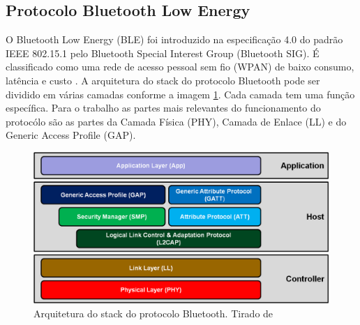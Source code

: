 \subsection{Protocolo Bluetooth Low Energy}
\label{subsec:protocolo_ble}

O Bluetooth Low Energy (BLE) foi introduzido na especificação 4.0 do padrão IEEE 802.15.1 pelo Bluetooth Special Interest Group (Bluetooth SIG). É classificado como uma rede de acesso pessoal sem fio (WPAN) de baixo consumo, latência e custo \cite{Bluetooth_SIG_Site}.
A arquitetura do stack do protocolo Bluetooth pode ser dividido em várias camadas conforme a imagem \ref{fig:ble-protocol-stack.png}. Cada camada tem uma função específica. Para o trabalho as partes mais relevantes do funcionamento do protocólo são as partes da Camada Física (PHY), Camada de Enlace (LL) e do Generic Access Profile (GAP).

\begin{figure}[H]
    \centering
    \includegraphics[width=1.0\textwidth]{images/ble-protocol-stack.png}
    \caption{Arquitetura do stack do protocolo Bluetooth. Tirado de \cite{Microchip_Site} }
    \label{fig:ble-protocol-stack.png}
\end{figure}



